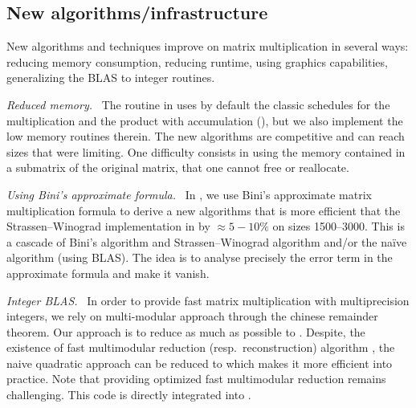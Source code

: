 \subsection{New algorithms/infrastructure}
%
New algorithms and techniques improve on matrix multiplication
in several  ways: reducing memory consumption, reducing runtime, 
using graphics capabilities, generalizing the BLAS to integer
routines.
%
\def\monitem#1{\par \textit{#1}\ }
\monitem{Reduced memory.}
%
The routine \fgemm in \fflas uses by default the classic schedules for the multiplication
and the product with accumulation (\cf \cite{Boyer:2009:sched}), but we also
implement the low memory routines therein. The new algorithms are competitive
and can reach sizes that were limiting.
%
%
One difficulty consists in using the memory contained in a submatrix of
the original matrix, that one cannot free or reallocate.
%
\monitem{Using Bini's approximate formula.}
%
In \cite{BD:2014:Bini}, we use Bini's approximate matrix multiplication formula
to derive a new algorithms that is more efficient that the Strassen--Winograd
implementation in \fgemm by $\approx 5-10\%$ on sizes \num{1500}--\num{3000}.
This is a cascade of Bini's algorithm and Strassen--Winograd algorithm and/or
the naïve algorithm (using BLAS). The idea is to analyse precisely the error
term in the approximate formula and make it vanish.
%
\monitem{Integer BLAS.}
%
In order to provide fast matrix multiplication with multiprecision integers, we
rely on multi-modular approach through the chinese remainder theorem. Our
approach is to reduce as much as possible to \fgemm. Despite, the existence of
fast multimodular reduction (resp.\ reconstruction) algorithm
\cite{VonzurGathen:1999:MCA}, the naive quadratic approach can be reduced to
\fgemm which makes it more efficient into practice.  Note that providing
optimized fast multimodular reduction remains challenging. This code is
directly integrated  into \fflas.

